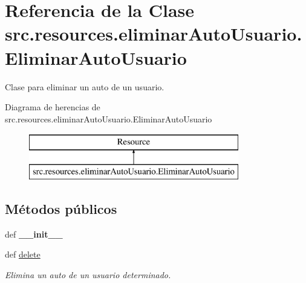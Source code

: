 \hypertarget{classsrc_1_1resources_1_1eliminar_auto_usuario_1_1_eliminar_auto_usuario}{\section{Referencia de la Clase src.\-resources.\-eliminar\-Auto\-Usuario.\-Eliminar\-Auto\-Usuario}
\label{classsrc_1_1resources_1_1eliminar_auto_usuario_1_1_eliminar_auto_usuario}
}


Clase para eliminar un auto de un usuario.  


Diagrama de herencias de src.\-resources.\-eliminar\-Auto\-Usuario.\-Eliminar\-Auto\-Usuario\begin{figure}[H]
\begin{center}
\leavevmode
\includegraphics[height=2.000000cm]{classsrc_1_1resources_1_1eliminar_auto_usuario_1_1_eliminar_auto_usuario}
\end{center}
\end{figure}
\subsection*{Métodos públicos}
\begin{DoxyCompactItemize}
\item 
\hypertarget{classsrc_1_1resources_1_1eliminar_auto_usuario_1_1_eliminar_auto_usuario_aabebf5d292e7ee2ed564aada86f1dc95}{def {\bfseries \-\_\-\-\_\-init\-\_\-\-\_\-}}\label{classsrc_1_1resources_1_1eliminar_auto_usuario_1_1_eliminar_auto_usuario_aabebf5d292e7ee2ed564aada86f1dc95}

\item 
def \hyperlink{classsrc_1_1resources_1_1eliminar_auto_usuario_1_1_eliminar_auto_usuario_aac1268a9c74bab80d45a5a38fe618373}{delete}
\begin{DoxyCompactList}\small\item\em Elimina un auto de un usuario determinado. \end{DoxyCompactList}\end{DoxyCompactItemize}
